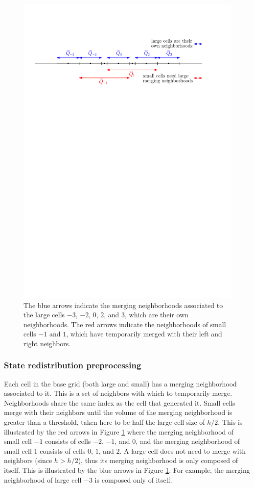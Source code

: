 \begin{figure}[h]
\begin{center}
\vspace*{.1in}
\includegraphics[width=0.75\linewidth]{figs/overlapping1.pdf} 
\caption{\sf 
The blue arrows indicate the merging neighborhoods associated to the large 
cells $-3$, $-2$, $0$, $2$, and $3$, which are their own neighborhoods.  
The red arrows indicate the neighborhoods of small cells $-1$ and $1$, which
have temporarily merged with their left and right neighbors.  
\label{fig:mn1}}
\end{center}
\end{figure}

\subsubsection*{State redistribution preprocessing}
Each cell in the base grid (both large and small) has a merging neighborhood associated to it.
This is  a set of neighbors with which to temporarily merge.
Neighborhoods share the same index as the cell that generated it.
Small cells merge with their neighbors until the volume of the merging neighborhood is greater than
a threshold, taken here to be half the large cell size of $h/2$.
This is illustrated by the red arrows in Figure \ref{fig:mn1} where the merging neighborhood of 
small cell $-1$ consists of cells $-2$, $-1$, and $0$, and the merging neighborhood of 
small cell 1 consists of cells $0$, $1$, and $2$. 
A large cell does not need to merge with neighbors (since $h > h/2$), thus its merging neighborhood is only 
composed of itself.  This is illustrated by the blue arrows in Figure
\ref{fig:mn1}. For example,  the 
merging neighborhood of large cell $-3$ is composed only of itself.


